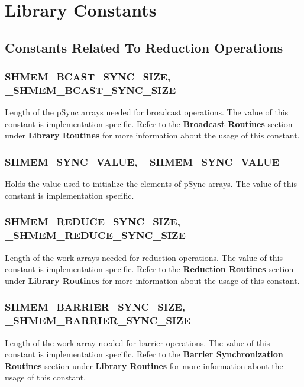 
\section{Library Constants}


\subsection{Constants Related To Reduction Operations}


\subsubsection{SHMEM\_BCAST\_SYNC\_SIZE, \_SHMEM\_BCAST\_SYNC\_SIZE}

Length of the pSync arrays needed for broadcast operations. The value
of this constant is implementation specific. Refer to the \textbf{Broadcast
Routines} section under \textbf{Library Routines} for more information
about the usage of this constant.


\subsubsection{SHMEM\_SYNC\_VALUE, \_SHMEM\_SYNC\_VALUE}

Holds the value used to initialize the elements of pSync arrays. The
value of this constant is implementation specific.


\subsubsection{SHMEM\_REDUCE\_SYNC\_SIZE, \_SHMEM\_REDUCE\_SYNC\_SIZE}

Length of the work arrays needed for reduction operations. The value
of this constant is implementation specific. Refer to the \textbf{Reduction
Routines} section under \textbf{Library Routines} for more information
about the usage of this constant.


\subsubsection{SHMEM\_BARRIER\_SYNC\_SIZE, \_SHMEM\_BARRIER\_SYNC\_SIZE }

Length of the work array needed for barrier operations. The value
of this constant is implementation specific. Refer to the \textbf{Barrier
Synchronization Routines} section under \textbf{Library Routines}
for more information about the usage of this constant.


